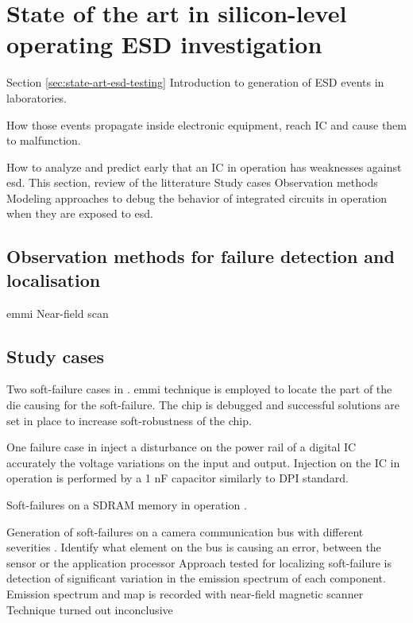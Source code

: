\section{State of the art in silicon-level operating ESD investigation}

Section \ref{sec:state-art-esd-testing}
Introduction to generation of ESD events in laboratories.

How those events propagate inside electronic equipment, reach \gls{IC} and cause them to malfunction.

How to analyze and predict early that an \gls{IC} in operation has weaknesses against \gls{esd}.
This section, review of the litterature
Study cases
Observation methods
Modeling approaches to debug the behavior of integrated circuits in operation when they are exposed to \gls{esd}.

\subsection{Observation methods for failure detection and localisation}

\gls{emmi}
Near-field scan

\subsection{Study cases}

Two soft-failure cases in \cite{systemLevelESDIC}.
\gls{emmi} technique is employed to locate the part of the die causing for the soft-failure.
The chip is debugged and successful solutions are set in place to increase soft-robustness of the chip.

One failure case in \cite{LacrampeTransientImmunity}
inject a disturbance on the power rail of a digital IC
accurately the voltage variations on the input and output.
Injection on the IC in operation is performed by a 1 nF capacitor similarly to DPI standard.

Soft-failures on a SDRAM memory in operation \cite{SDRAMCase}.

Generation of soft-failures on a camera communication bus with different severities \cite{softFailSubsystem}.
Identify what element on the bus is causing an error, between the sensor or the application processor
Approach tested for localizing soft-failure is detection of significant variation in the emission spectrum of each component.
Emission spectrum and map is recorded with near-field magnetic scanner
Technique turned out inconclusive

